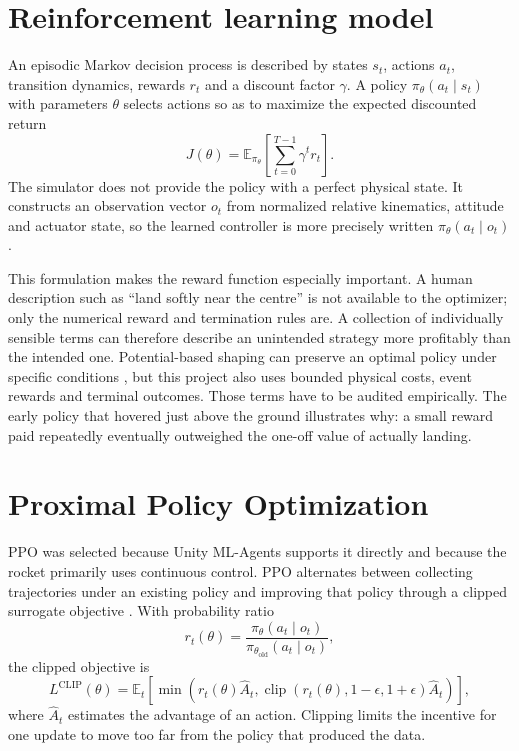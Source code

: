 \section{Reinforcement learning model}

An episodic Markov decision process is described by states $s_t$, actions $a_t$, transition
dynamics, rewards $r_t$ and a discount factor $\gamma$. A policy
$\pi_\theta(a_t\mid s_t)$ with parameters $\theta$ selects actions so as to maximize the expected
discounted return
\begin{equation}
  J(\theta)=\mathbb{E}_{\pi_\theta}\!\left[\sum_{t=0}^{T-1}\gamma^t r_t\right].
  \label{eq:return}
\end{equation}
The simulator does not provide the policy with a perfect physical state. It constructs an
observation vector $o_t$ from normalized relative kinematics, attitude and actuator state, so
the learned controller is more precisely written $\pi_\theta(a_t\mid o_t)$.

This formulation makes the reward function especially important. A human description such as
``land softly near the centre'' is not available to the optimizer; only the numerical reward
and termination rules are. A collection of individually sensible terms can therefore describe
an unintended strategy more profitably than the intended one. Potential-based shaping can
preserve an optimal policy under specific conditions \cite{ng1999policy}, but this project also
uses bounded physical costs, event rewards and terminal outcomes. Those terms have to be audited
empirically. The early policy that hovered just above the ground illustrates why: a small reward
paid repeatedly eventually outweighed the one-off value of actually landing.

\section{Proximal Policy Optimization}

PPO was selected because Unity ML-Agents supports it directly and because the rocket primarily
uses continuous control. PPO alternates between collecting trajectories under an existing
policy and improving that policy through a clipped surrogate objective
\cite{schulman2017ppo}. With probability ratio
\begin{equation}
  r_t(\theta)=\frac{\pi_\theta(a_t\mid o_t)}
  {\pi_{\theta_{\mathrm{old}}}(a_t\mid o_t)},
\end{equation}
the clipped objective is
\begin{equation}
  L^{\mathrm{CLIP}}(\theta)=
  \mathbb{E}_t\left[\min\left(r_t(\theta)\hat A_t,
  \operatorname{clip}(r_t(\theta),1-\epsilon,1+\epsilon)\hat A_t\right)\right],
  \label{eq:ppo}
\end{equation}
where $\hat A_t$ estimates the advantage of an action. Clipping limits the incentive for one
update to move too far from the policy that produced the data.

